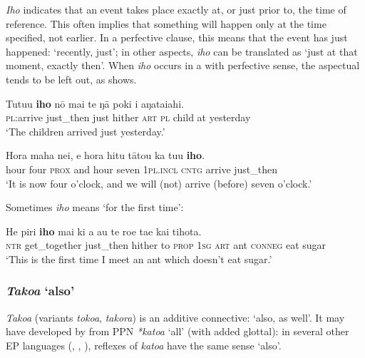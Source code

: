 \textit{Iho} indicates that an event takes place exactly at, or just prior to, the time of reference. This often implies that something will happen only at the time specified, not earlier. In a perfective clause, this means that the event has just happened: ‘recently, just’; in other aspects, \textit{iho} can be translated as ‘just at that moment, exactly then’. When \textit{iho} occurs in a  with perfective sense, the aspectual tends to be left out, as  shows. 

\ea\label{ex:4.129}
\gll Tutu{\ꞌ}u \textbf{iho} nō mai te ŋā poki {\ꞌ}i {\ꞌ}aŋataiahi. \\
\textsc{pl}:arrive just\_then just hither \textsc{art} \textsc{pl} child at yesterday \\

\glt 
‘The children arrived just yesterday.’ \textstyleExampleref{[R245.225]} 
\z

\ea\label{ex:4.130}
\gll Hora maha nei, {\ꞌ}e hora hitu tātou ka tu{\ꞌ}u \textbf{iho}. \\
hour four \textsc{prox} and hour seven \textsc{1pl.incl} \textsc{cntg} arrive just\_then \\

\glt
‘It is now four o’clock, and we will (not) arrive (before) seven o’clock.’ \textstyleExampleref{[R210.198]} 
\z

Sometimes \textit{iho} means ‘for the first time’:

\ea\label{ex:4.131}
\gll He piri \textbf{iho} mai ki a au te roe ta{\ꞌ}e kai tihota. \\
\textsc{ntr} get\_together just\_then hither to \textsc{prop} \textsc{1sg} \textsc{art} ant \textsc{conneg} eat sugar \\

\glt 
‘This is the first time I meet an ant which doesn’t eat sugar.’ \textstyleExampleref{[R214.008]} 
\z

\subsubsection{\textit{Tako{\ꞌ}a} ‘also’}\label{sec:4.5.3.2}
\textit{Tako{\ꞌ}a} (variants \textit{toko{\ꞌ}a}, \textit{takora}) is an additive connective: ‘also, as well’. It may have developed by  from PPN \textit{*katoa} ‘all’ (with added glottal): in several other EP languages (, , ), reflexes of \textit{katoa} have the same sense ‘also’.

